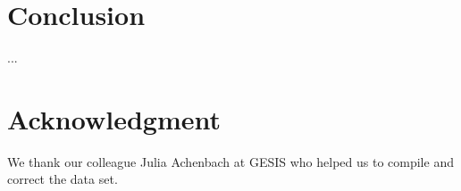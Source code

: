 \documentclass[runningheads,a4paper]{llncs}
\begin{document}
\section{Conclusion}\label{concl}
...%


\section{Acknowledgment}\label{sec:ACKNOWLEDGMENTS}
We thank our colleague Julia Achenbach at GESIS who helped us to compile and correct the data set.


 
\end{document}
